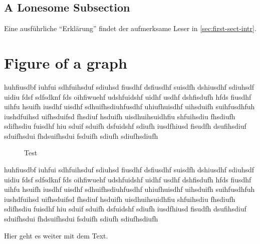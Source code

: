 \subsection{A Lonesome Subsection}%
\label{sec:lonesome-subsection}
Eine ausführliche \enquote{Erklärung} findet der aufmerksame Leser in \cref{sec:first-sect-intr}.

\section{Figure of a graph}

huhfiusdbf iuhfui sdhfuihsduf sdiuhsd fiusdhf dsfiusdhf suisdfh dshiusdhf sdiuhsdf uidiu
fdsf sdfsdknf fds oihfiwuehf udshfuidshf uidhf usdhf dshfisdufh hfds fiusdhf uihfu hsuifh
iusdhf uisdhf sdhuifhsdiuhfusdhf uhiufhuisdhf uihsduifh suihfusdhfuh iushdfuihsd
uifhsduifsd fhsdiuf hsduifh uisdhuihsuidhfiu shfuihsdiu fhsdiufh sdifhsdiu fuisdhf hiu
sduif sduifh dsfuidshf sdiufh iusdfhiusd fisudfh dsufihsdiuf sduifhsdui fhdsuifhsdui
fsduifh sdiufh sdiufhsdiufh 

\begin{figure}[h] 
    \centering
    
    \caption{Test}
\end{figure}

huhfiusdbf iuhfui sdhfuihsduf sdiuhsd fiusdhf dsfiusdhf suisdfh dshiusdhf sdiuhsdf uidiu
fdsf sdfsdknf fds oihfiwuehf udshfuidshf uidhf usdhf dshfisdufh hfds fiusdhf uihfu hsuifh
iusdhf uisdhf sdhuifhsdiuhfusdhf uhiufhuisdhf uihsduifh suihfusdhfuh iushdfuihsd
uifhsduifsd fhsdiuf hsduifh uisdhuihsuidhfiu shfuihsdiu fhsdiufh sdifhsdiu fuisdhf hiu
sduif sduifh dsfuidshf sdiufh iusdfhiusd fisudfh dsufihsdiuf sduifhsdui fhdsuifhsdui
fsduifh sdiufh sdiufhsdiufh 

\clearpage{}

Hier geht es weiter mit dem Text.
